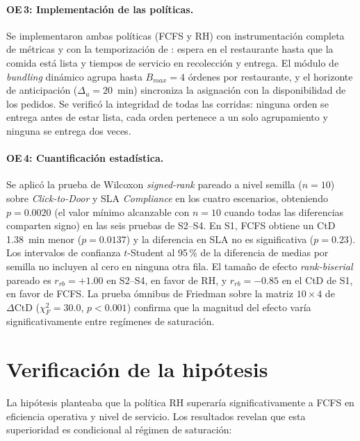 \documentclass[12pt,letterpaper,oneside]{book}
\begin{document}
	\paragraph{OE\,3: Implementación de las políticas.}
	Se implementaron ambas políticas (FCFS y RH) con instrumentación completa de
	métricas y con la temporización de \citet{Reyes2018}: espera en el restaurante hasta que
	la comida está lista y tiempos de servicio en recolección y entrega.  El módulo de \emph{bundling} dinámico agrupa hasta $B_{max} = 4$
	órdenes por restaurante, y el horizonte de anticipación ($\Delta_u = 20$~min)
	sincroniza la asignación con la disponibilidad de los pedidos.
	Se verificó la integridad de todas las corridas: ninguna orden se entrega antes de estar
	lista, cada orden pertenece a un solo agrupamiento y ninguna se entrega dos veces.

	\paragraph{OE\,4: Cuantificación estadística.}
	Se aplicó la prueba de Wilcoxon \textit{signed-rank} pareado a nivel semilla
	($n = 10$) sobre \textit{Click-to-Door} y SLA \textit{Compliance} en los cuatro escenarios,
	obteniendo $p = 0{.}0020$ (el valor mínimo alcanzable con $n = 10$ cuando
	todas las diferencias comparten signo) en las seis pruebas de S2--S4.  En S1, FCFS
	obtiene un CtD 1.38~min menor ($p = 0{.}0137$) y la diferencia en SLA no es
	significativa ($p = 0{.}23$).  Los
	intervalos de confianza $t$-Student al 95\,\% de la diferencia de medias
	por semilla no incluyen al cero en ninguna otra fila.  El tamaño de efecto
	\textit{rank-biserial} pareado es $r_{rb} = +1{.}00$ en S2--S4, en favor de RH,
	y $r_{rb} = -0{.}85$ en el CtD de S1, en favor de FCFS.  La prueba
	ómnibus de Friedman sobre la matriz $10 \times 4$ de $\Delta\text{CtD}$
	($\chi^2_F = 30{.}0$, $p < 0{.}001$) confirma que la magnitud del efecto
	varía significativamente entre regímenes de saturación.

	\section{Verificación de la hipótesis}

	La hipótesis planteaba que la política RH superaría significativamente a FCFS en
	eficiencia operativa y nivel de servicio.  Los resultados revelan que esta
	superioridad es condicional al régimen de saturación:
\end{document}
